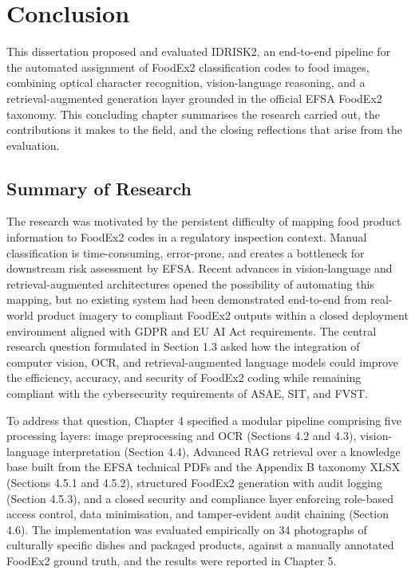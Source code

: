 \hypertarget{conclusion}{%
\chapter{Conclusion}\label{conclusion}}

This dissertation proposed and evaluated IDRISK2, an end-to-end pipeline for the automated assignment of FoodEx2 classification codes to food images, combining optical character recognition, vision-language reasoning, and a retrieval-augmented generation layer grounded in the official EFSA FoodEx2 taxonomy. This concluding chapter summarises the research carried out, the contributions it makes to the field, and the closing reflections that arise from the evaluation.

\hypertarget{summary-of-research}{%
\section{Summary of Research}\label{summary-of-research}}

The research was motivated by the persistent difficulty of mapping food product information to FoodEx2 codes in a regulatory inspection context. Manual classification is time-consuming, error-prone, and creates a bottleneck for downstream risk assessment by EFSA. Recent advances in vision-language and retrieval-augmented architectures opened the possibility of automating this mapping, but no existing system had been demonstrated end-to-end from real-world product imagery to compliant FoodEx2 outputs within a closed deployment environment aligned with GDPR and EU AI Act requirements. The central research question formulated in Section 1.3 asked how the integration of computer vision, OCR, and retrieval-augmented language models could improve the efficiency, accuracy, and security of FoodEx2 coding while remaining compliant with the cybersecurity requirements of ASAE, SIT, and FVST.

To address that question, Chapter 4 specified a modular pipeline comprising five processing layers: image preprocessing and OCR (Sections 4.2 and 4.3), vision-language interpretation (Section 4.4), Advanced RAG retrieval over a knowledge base built from the EFSA technical PDFs and the Appendix B taxonomy XLSX (Sections 4.5.1 and 4.5.2), structured FoodEx2 generation with audit logging (Section 4.5.3), and a closed security and compliance layer enforcing role-based access control, data minimisation, and tamper-evident audit chaining (Section 4.6). The implementation was evaluated empirically on 34 photographs of culturally specific dishes and packaged products, against a manually annotated FoodEx2 ground truth, and the results were reported in Chapter 5.

